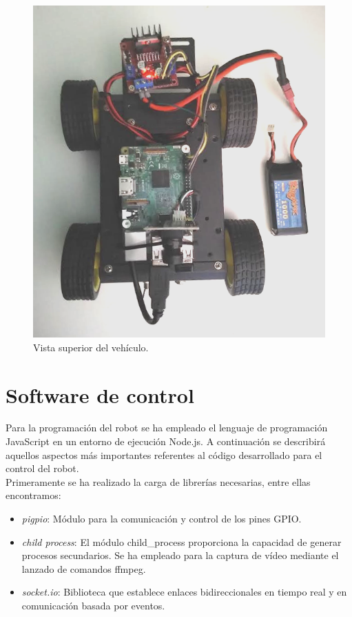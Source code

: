 \begin{figure}[H]
  \begin{center}
    \includegraphics[scale=0.4]{imagenes/robot/robot-bateria-lipo.png}
  \end{center}
  \caption{Vista superior del vehículo.}
  \label{figura:rpi-modulo-bateria}
\end{figure}

    
\section{Software de control}
  

Para la programación del robot se ha empleado el lenguaje de programación JavaScript en un entorno de ejecución Node.js. A continuación se describirá aquellos aspectos más importantes
referentes al código desarrollado para el control del robot.\\

Primeramente se ha realizado la carga de librerías necesarias, entre ellas encontramos:

\begin{itemize}
 \item \emph{pigpio}: Módulo para la comunicación y control de los pines GPIO.
 \item \emph{child process}: El módulo child\_process proporciona la capacidad de generar procesos secundarios. Se ha empleado para la captura de vídeo mediante el lanzado de comandos ffmpeg.
 \item \emph{socket.io}: Biblioteca que establece enlaces bidireccionales en tiempo real y en comunicación basada por eventos.
\end{itemize}



